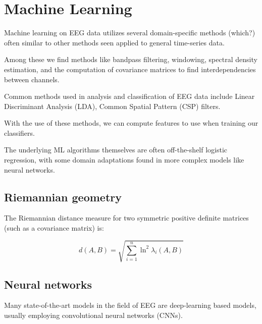 \section{Machine Learning}

    Machine learning on EEG data utilizes several domain-specific methods (which?) often similar to other methods seen applied to general time-series data.

    Among these we find methods like bandpass filtering, windowing, spectral density estimation, and the computation of covariance matrices to find interdependencies between channels.

    Common methods used in analysis and classification of EEG data include Linear Discriminant Analysis (LDA), Common Spatial Pattern (CSP) filters.

    With the use of these methods, we can compute features to use when training our classifiers.

    The underlying ML algorithms themselves are often off-the-shelf logistic regression, with some domain adaptations found in more complex models like neural networks.


    \subsection{Riemannian geometry}


        The Riemannian distance measure for two symmetric positive definite matrices (such as a covariance matrix) is:~\cite{grafarend_metric_2003}

        \[ d(A, B) = \sqrt{\sum_{i=1}^{n} \ln^2 \lambda_i (A, B) } \]

    \subsection{Neural networks}

        Many state-of-the-art models in the field of EEG are deep-learning based models, usually employing convolutional neural networks (CNNs).
